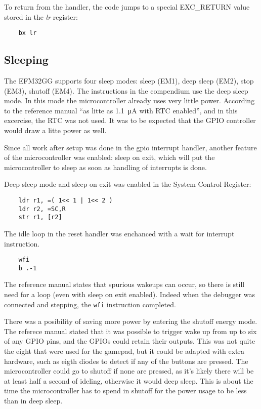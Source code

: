 To return from the handler, the code jumps to a special EXC\_RETURN value stored in the \emph{lr} register:

\begin{verbatim}
    bx lr
\end{verbatim}


\subsection{Sleeping}
The EFM32GG supports four sleep modes: sleep (EM1), deep sleep (EM2), stop (EM3), shutoff (EM4).
The instructions in the compendium use the deep sleep mode.
In this mode the microcontroller already uses very little power.
According to the reference manual ``as litte as \SI{1.1}{\micro\ampere} with RTC enabled'', and in this excercise, the RTC was not used.
It was to be expected that the GPIO controller would draw a litte power as well.

Since all work after setup was done in the gpio interrupt handler, another feature of the microcontroller was enabled: sleep on exit, which will put the microcontroller to sleep as soon as handling of interrupts is done.

Deep sleep mode and sleep on exit was enabled in the System Control Register:
\begin{verbatim}
    ldr r1, =( 1<< 1 | 1<< 2 )
    ldr r2, =SC,R
    str r1, [r2]
\end{verbatim}

The idle loop in the reset handler was enchanced with a wait for interrupt instruction.
\begin{verbatim}
    wfi
    b .-1
\end{verbatim}

The reference manual states that spurious wakeups can occur, so there is still need for a loop (even with sleep on exit enabled).
Indeed when the debugger was connected and stepping, the \texttt{wfi} instruction completed.

There was a posibility of saving more power by entering the shutoff energy mode.
The referece manual stated that it was possible to trigger wake up from up to six of any GPIO pins, and the GPIOs could retain their outputs.
This was not quite the eight that were used for the gamepad, but it could be adapted with extra hardware, such as eigth diodes to detect if any of the buttons are pressed.
The microcontroller could go to shutoff if none are pressed, as it's likely there will be at least half a second of ideling, otherwise it would deep sleep.
This is about the time the microcontroller has to spend in shutoff for the power usage to be less than in deep sleep.
